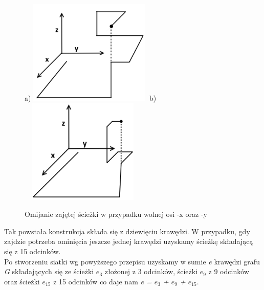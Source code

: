 \documentclass[brudnopis]{xmgr}
\begin{document}
\begin{figure}[ht!]
  \centering
  a)\includegraphics[width=6cm,height=5cm]{rysunki/zajete_z.png}
  b)\includegraphics[width=6cm,height=5cm]{rysunki/zajete_z2.png}
  \caption{Omijanie zajętej ścieżki w przypadku wolnej osi -x oraz -y}
  \label{fig:nakladanie}
\end{figure} 
Tak powstała konstrukcja składa się z dziewięciu krawędzi. W przypadku, gdy zajdzie potrzeba ominięcia jeszcze jednej krawędzi uzyskamy ścieżkę składającą się z 15 odcinków.
\\\indent Po stworzeniu siatki wg powyższego przepisu uzyskamy w sumie \textit{e} krawędzi grafu \textit{G} składających się ze ścieżki $e_3$ złożonej z 3 odcinków, ścieżki $e_9$ z 9 odcinków oraz ścieżki $e_{15}$ z 15 odcinków co daje nam \textit{e = $e_3$ + $e_9$ + $e_{15}$}.
\end{document}
